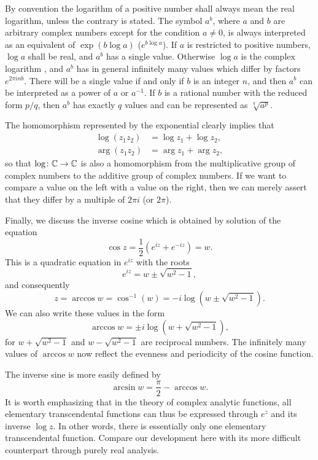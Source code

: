 By convention the logarithm of a positive number shall always mean the real logarithm, unless the contrary is stated. The symbol $a^b$, where $a$ and $b$ are arbitrary complex numbers except for the condition $a \neq 0$, is always interpreted as an equivalent of $\exp(b \log a)$ ($e^{b \log a}$). If $a$ is restricted to positive numbers, $\log a$ shall be real, and $a^b$ has a single value. Otherwise $\log a$ is the complex logarithm , and $a^b$ has in general infinitely many values which differ by factors $e^{2 \pi i nb}$. There will be a single value if and only if $b$ is an integer $n$, and then $a^b$ can be interpreted as a power of $a$ or $a^{-1}$. If $b$ is a rational number with the reduced form $p/q$, then $a^b$ has exactly $q$ values and can be represented as $\sqrt[q]{a^p}$.

The homomorphism represented by the exponential clearly implies that
\begin{align*}
	\log(z_1z_2) &=\log z_1+\log z_2, \\
	\arg(z_1z_2) &=\arg z_1+\arg z_2,
\end{align*}
so that $\log \colon \mathbb C \rightarrow \mathbb C$ is also a homomorphism from the multiplicative group of complex numbers to the additive group of complex numbers. If we want to compare a value on the left with a value on the right, then we can merely assert that they differ by a multiple of $2\pi i$ (or $2\pi$).

Finally, we discuss the inverse cosine which is obtained by solution of the equation $$\cos z=\dfrac{1}{2}\left(e^{iz}+e^{-iz}\right)=w.$$ This is a quadratic equation in $e^{iz}$ with the roots $$e^{iz}=w \pm \sqrt{w^2-1},$$ and consequently $$z= \arccos w=\cos^{-1}(w)=-i \log \left(w \pm \sqrt{w^2-1}\right).$$ We can also write these values in the form $$\arccos w=\pm i \log\left(w+\sqrt{w^2-1}\right),$$ for $w+\sqrt{w^2-1}$ and $w-\sqrt{w^2-1}$ are reciprocal numbers. The infinitely many values of $\arccos w$ now reflect the evenness and periodicity of the cosine function.

The inverse sine is more easily defined by $$\arcsin w=\dfrac{\pi}{2}-\arccos w.$$ It is worth emphasizing that in the theory of complex analytic functions, all elementary transcendental functions can thus be expressed through $e^z$ and its inverse $\log z$. In other words, there is essentially only one elementary transcendental function. Compare our development here with its more difficult counterpart through purely real analysis.

